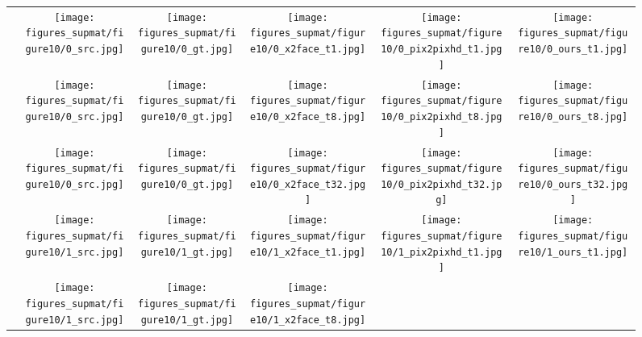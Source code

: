 \documentclass[10pt,twocolumn,letterpaper]{article}
\begin{document}
\begin{figure*}
    \centering    
    \setlength{\wid}{0.179\textwidth}
    \addtolength{\tabcolsep}{-4pt}
    \begin{tabular}{m{0.6cm}c:cccc}
        &
        \texttt{[image: figures\_supmat/figure10/0\_src.jpg]}
        \;&\;
        \texttt{[image: figures\_supmat/figure10/0\_gt.jpg]}&
        \texttt{[image: figures\_supmat/figure10/0\_x2face\_t1.jpg]}&
        \texttt{[image: figures\_supmat/figure10/0\_pix2pixhd\_t1.jpg]}&
        \texttt{[image: figures\_supmat/figure10/0\_ours\_t1.jpg]}\\
        &
        \texttt{[image: figures\_supmat/figure10/0\_src.jpg]}
        \;&\;
        \texttt{[image: figures\_supmat/figure10/0\_gt.jpg]}&
        \texttt{[image: figures\_supmat/figure10/0\_x2face\_t8.jpg]}&
        \texttt{[image: figures\_supmat/figure10/0\_pix2pixhd\_t8.jpg]}&
        \texttt{[image: figures\_supmat/figure10/0\_ours\_t8.jpg]}\\
        &
        \texttt{[image: figures\_supmat/figure10/0\_src.jpg]}
        \;&\;
        \texttt{[image: figures\_supmat/figure10/0\_gt.jpg]}&
        \texttt{[image: figures\_supmat/figure10/0\_x2face\_t32.jpg]}&
        \texttt{[image: figures\_supmat/figure10/0\_pix2pixhd\_t32.jpg]}&
        \texttt{[image: figures\_supmat/figure10/0\_ours\_t32.jpg]}\\
        &
        \texttt{[image: figures\_supmat/figure10/1\_src.jpg]}
        \;&\;
        \texttt{[image: figures\_supmat/figure10/1\_gt.jpg]}&
        \texttt{[image: figures\_supmat/figure10/1\_x2face\_t1.jpg]}&
        \texttt{[image: figures\_supmat/figure10/1\_pix2pixhd\_t1.jpg]}&
        \texttt{[image: figures\_supmat/figure10/1\_ours\_t1.jpg]}\\
        &
        \texttt{[image: figures\_supmat/figure10/1\_src.jpg]}
        \;&\;
        \texttt{[image: figures\_supmat/figure10/1\_gt.jpg]}&
        \texttt{[image: figures\_supmat/figure10/1\_x2face\_t8.jpg]}&

\end{tabular}
\end{figure*}
\end{document}
